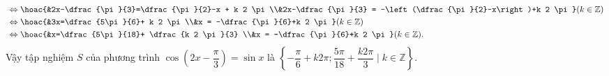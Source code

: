 \begin{ex}
{\begin{itemchoice}
\begin{align*}
				&\Leftrightarrow \hoac{&2x-\dfrac{\pi}{3}=\dfrac{\pi}{2}-x + k 2 \pi \\&2x-\dfrac{\pi}{3} = -\left(\dfrac{\pi}{2}-x\right)+k 2 \pi} (k \in \mathbb{Z}) \\
				&\Leftrightarrow \hoac{&3x=\dfrac{5\pi}{6}+ k 2 \pi \\&x = -\dfrac{\pi}{6}+k 2 \pi} (k \in \mathbb{Z}) \\
				&\Leftrightarrow \hoac{&x=\dfrac{5\pi}{18}+ \dfrac{k 2 \pi}{3} \\&x = -\dfrac{\pi}{6}+k 2 \pi} (k \in \mathbb{Z}).
			\end{align*}
			Vậy tập nghiệm $S$ của phương trình $\cos \left(2x-\dfrac{\pi}{3}\right)=\sin x$ là $\left\{-\dfrac{\pi}{6}+k2\pi; \dfrac{5 \pi}{18}+\dfrac{k 2 \pi}{3} \mid k \in \mathbb{Z}\right\}$.
		\end{itemchoice}
	}
\end{ex}
